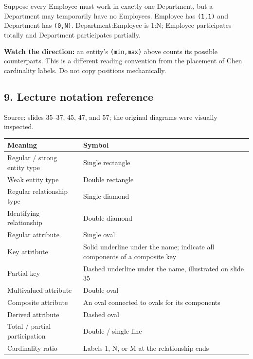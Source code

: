 Suppose every Employee must work in exactly one Department, but a Department may temporarily have no Employees. Employee has \texttt{(\allowbreak{}1,\allowbreak{}1)\allowbreak{}} and Department has \texttt{(\allowbreak{}0,\allowbreak{}N)\allowbreak{}}. Department:Employee is 1:N; Employee participates totally and Department participates partially.

\textbf{Watch the direction:} an entity's \texttt{(\allowbreak{}min,\allowbreak{}max)\allowbreak{}} above counts its possible counterparts. This is a different reading convention from the placement of Chen cardinality labels. Do not copy positions mechanically.

\subsection{9. Lecture notation reference}\label{02_er_modelling_en-lecture-notation-reference}

Source: slides 35--37, 45, 47, and 57; the original diagrams were visually inspected.

\begin{longtable}[]{@{}
  >{\raggedright\arraybackslash}p{}
  >{\raggedright\arraybackslash}p{}@{}}
\toprule\noalign{}
\begin{minipage}[b]{\linewidth}\raggedright
Meaning
\end{minipage} & \begin{minipage}[b]{\linewidth}\raggedright
Symbol
\end{minipage} \\
\midrule\noalign{}
\endhead
\bottomrule\noalign{}
\endlastfoot
Regular / strong entity type & Single rectangle \\
Weak entity type & Double rectangle \\
Regular relationship type & Single diamond \\
Identifying relationship & Double diamond \\
Regular attribute & Single oval \\
Key attribute & Solid underline under the name; indicate all components of a composite key \\
Partial key & Dashed underline under the name, illustrated on slide 35 \\
Multivalued attribute & Double oval \\
Composite attribute & An oval connected to ovals for its components \\
Derived attribute & Dashed oval \\
Total / partial participation & Double / single line \\
Cardinality ratio & Labels 1, N, or M at the relationship ends \\
\end{longtable}

